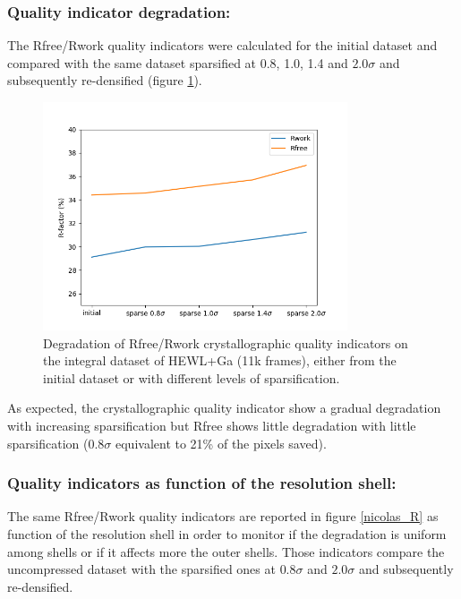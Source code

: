 \documentclass[preprint]{iucr}              %
\begin{document}
\subsubsection{Quality indicator degradation:}
The Rfree/Rwork quality indicators \cite{Rfree} were calculated for the initial dataset and compared with the same dataset sparsified at 0.8, 1.0, 1.4 and $2.0\sigma$ and subsequently re-densified (figure \ref{Rfree}). 

\begin{figure}
\label{Rfree}
\begin{center}
\includegraphics[width=9cm]{fig_Rfree}
\caption{Degradation of Rfree/Rwork crystallographic quality indicators on the integral dataset of HEWL+Ga (11k frames), either from the initial dataset or with different levels of sparsification.}
\end{center}
\end{figure}
As expected, the crystallographic quality indicator show a gradual degradation with increasing sparsification but Rfree shows little degradation with little sparsification ($0.8\sigma$ equivalent to 21\% of the pixels saved).

\subsubsection{Quality indicators as function of the resolution shell:}
The same Rfree/Rwork quality indicators are reported in figure \ref{nicolas_R} as function of the resolution shell in order to monitor if the degradation is uniform among shells or if it affects more the outer shells.
Those indicators compare the uncompressed dataset with the sparsified ones at $0.8\sigma$ and $2.0\sigma$ and subsequently re-densified.
\end{document}
